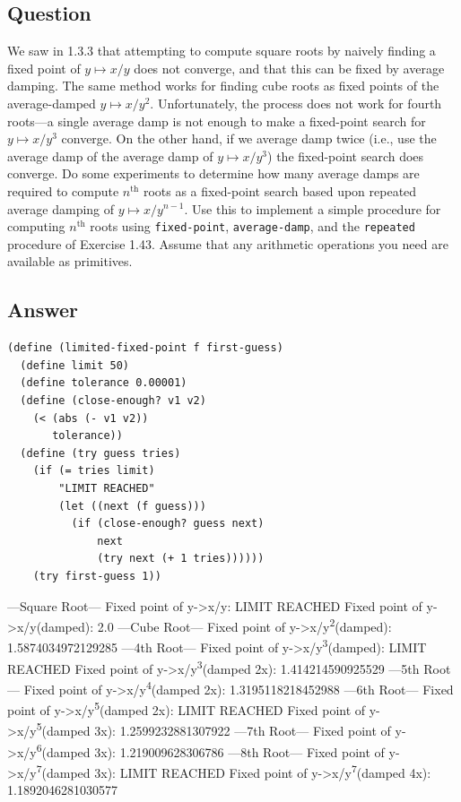 \documentclass[final,fleqn,titlepage]{article}
\begin{document}
\subsection{Question}
\label{sec:org2be3878}
We saw in 1.3.3 that attempting to compute square roots by naively finding a
fixed point of \(y \mapsto x / y\) does not converge, and that this can be fixed by
average damping. The same method works for finding cube roots as fixed points of
the average-damped \(y \mapsto x / y^2\). Unfortunately, the process does not work for
fourth roots---a single average damp is not enough to make a fixed-point search
for \(y \mapsto x / y^3\) converge. On the other hand, if we average damp twice (i.e.,
use the average damp of the average damp of \(y \mapsto x / y^3\)) the fixed-point
search does converge. Do some experiments to determine how many average damps
are required to compute \(n^{\mathrm{th}}\) roots as a fixed-point search based
upon repeated average damping of \(y \mapsto x / y^{n-1}\). Use this to implement a
simple procedure for computing \(n^{\mathrm{th}}\) roots using \texttt{fixed-point},
\texttt{average-damp}, and the \texttt{repeated} procedure of Exercise 1.43. Assume that any
arithmetic operations you need are available as primitives.
\subsection{Answer}
\label{sec:org53c8c29}
\begin{verbatim}
(define (limited-fixed-point f first-guess)
  (define limit 50)
  (define tolerance 0.00001)
  (define (close-enough? v1 v2)
    (< (abs (- v1 v2)) 
       tolerance))
  (define (try guess tries)
    (if (= tries limit)
        "LIMIT REACHED"
        (let ((next (f guess)))
          (if (close-enough? guess next)
              next
              (try next (+ 1 tries))))))
    (try first-guess 1))
\end{verbatim}
---Square Root---
Fixed point of y->x/y: LIMIT REACHED
Fixed point of y->x/y(damped): 2.0
---Cube Root---
Fixed point of y->x/y\textsuperscript{2}(damped): 1.5874034972129285
---4th Root---
Fixed point of y->x/y\textsuperscript{3}(damped): LIMIT REACHED
Fixed point of y->x/y\textsuperscript{3}(damped 2x): 1.414214590925529
---5th Root---
Fixed point of y->x/y\textsuperscript{4}(damped 2x): 1.3195118218452988
---6th Root---
Fixed point of y->x/y\textsuperscript{5}(damped 2x): LIMIT REACHED
Fixed point of y->x/y\textsuperscript{5}(damped 3x): 1.2599232881307922
---7th Root---
Fixed point of y->x/y\textsuperscript{6}(damped 3x): 1.219009628306786
---8th Root---
Fixed point of y->x/y\textsuperscript{7}(damped 3x): LIMIT REACHED
Fixed point of y->x/y\textsuperscript{7}(damped 4x): 1.1892046281030577
\end{document}
